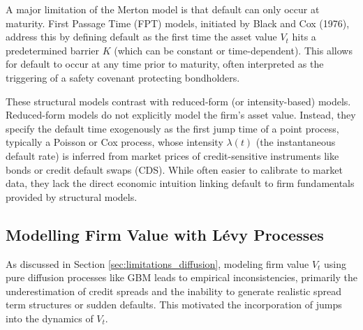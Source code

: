 \documentclass[11pt,twoside,openright]{report}
\begin{document}
A major limitation of the Merton model is that default can only occur at maturity. First Passage Time (FPT) models, initiated by Black and Cox (1976), address this by defining default as the first time the asset value $V_t$ hits a predetermined barrier $K$ (which can be constant or time-dependent). This allows for default to occur at any time prior to maturity, often interpreted as the triggering of a safety covenant protecting bondholders.

These structural models contrast with reduced-form (or intensity-based) models. Reduced-form models do not explicitly model the firm's asset value. Instead, they specify the default time exogenously as the first jump time of a point process, typically a Poisson or Cox process, whose intensity $\lambda(t)$ (the instantaneous default rate) is inferred from market prices of credit-sensitive instruments like bonds or credit default swaps (CDS). While often easier to calibrate to market data, they lack the direct economic intuition linking default to firm fundamentals provided by structural models.

\subsection{Modelling Firm Value with Lévy Processes}
\label{subsec:modelling_firm_value}

As discussed in Section \ref{sec:limitations_diffusion}, modeling firm value $V_t$ using pure diffusion processes like GBM leads to empirical inconsistencies, primarily the underestimation of credit spreads and the inability to generate realistic spread term structures or sudden defaults. This motivated the incorporation of jumps into the dynamics of $V_t$.
\end{document}
